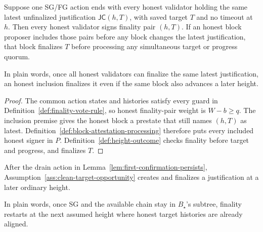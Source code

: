 \begin{lemma}
\label{lem:honest-proposer-finalizes}
Suppose one SG/FG action ends with every honest validator holding the same
latest unfinalized justification \(\mathsf{JC}(h,T)\), with saved target \(T\)
and no timeout at \(h\).  Then every honest validator signs finality pair
\((h,T)\).  If an honest block proposer includes those pairs before any block
changes the latest justification, that block finalizes \(T\) before
processing any simultaneous target or progress quorum.

In plain words, once all honest validators can finalize the same latest
justification, an honest inclusion finalizes it even if the same block
also advances a later height.
\end{lemma}

\begin{proof}
The common action states and histories satisfy every guard in
Definition~\ref{def:finality-vote-rule}, so honest finality-pair weight is
\(W-b\geq q\).  The inclusion premise gives the honest block a prestate that
still names \((h,T)\) as latest.
Definition~\ref{def:block-attestation-processing} therefore puts every
included honest signer in \(P\).  Definition~\ref{def:height-outcome} checks
finality before target and progress, and finalizes \(T\).
\end{proof}

\begin{lemma}
\label{lem:post-healing-finality}
After the drain action in
Lemma~\ref{lem:first-confirmation-persists},
Assumption~\ref{ass:clean-target-opportunity} creates and finalizes a
justification at a later ordinary height.

In plain words, once SG and the available chain stay in
\(B_\star\)'s subtree,
finality restarts at the next assumed height where honest target histories
are already aligned.
\end{lemma}

